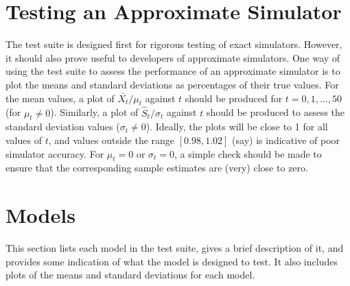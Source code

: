 \documentclass[12pt,a4paper]{article}
\begin{document}
\section{Testing an Approximate Simulator}

The test suite is designed first for rigorous testing of exact
simulators. However, it should also prove useful to developers of
approximate simulators. One way of using the test suite to assess the
performance of an approximate simulator is to plot the means and
standard deviations as percentages of their true values. For the mean
values, a plot of $\bar{X_t}/\mu_t$ against $t$ should be produced for
$t=0,1,\ldots,50$ (for $\mu_t\not=0$). Similarly, a plot of
$\hat{S}_t/\sigma_t$ against $t$ should be produced to assess the
standard deviation values ($\sigma_t\not=0$). Ideally, the plots will
be close to 1 for all values of $t$, and values outside the range
$[0.98,1.02]$ (say) is indicative of poor simulator accuracy. For
$\mu_t=0$ or $\sigma_t=0$, a simple check should be made to ensure
that the corresponding sample estimates are (very) close to zero.

\section{Models}

This section lists each model in the test suite, gives a brief
description of it, and provides some indication of what the model is
designed to test. It also includes plots of the means and standard
deviations for each model.




\end{document}
